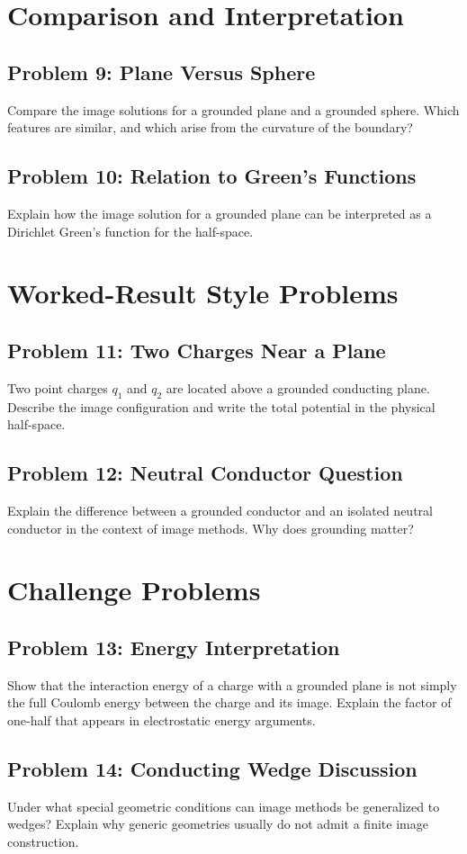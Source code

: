 \documentclass[hidelinks]{article}
\begin{document}
\section{Comparison and Interpretation}
\subsection{Problem 9: Plane Versus Sphere}
Compare the image solutions for a grounded plane and a grounded sphere. Which features are similar, and which arise from the curvature of the boundary?

\subsection{Problem 10: Relation to Green's Functions}
Explain how the image solution for a grounded plane can be interpreted as a Dirichlet Green's function for the half-space.

\section{Worked-Result Style Problems}
\subsection{Problem 11: Two Charges Near a Plane}
Two point charges $q_1$ and $q_2$ are located above a grounded conducting plane. Describe the image configuration and write the total potential in the physical half-space.

\subsection{Problem 12: Neutral Conductor Question}
Explain the difference between a grounded conductor and an isolated neutral conductor in the context of image methods. Why does grounding matter?

\section{Challenge Problems}
\subsection{Problem 13: Energy Interpretation}
Show that the interaction energy of a charge with a grounded plane is not simply the full Coulomb energy between the charge and its image. Explain the factor of one-half that appears in electrostatic energy arguments.

\subsection{Problem 14: Conducting Wedge Discussion}
Under what special geometric conditions can image methods be generalized to wedges? Explain why generic geometries usually do not admit a finite image construction.
\end{document}
